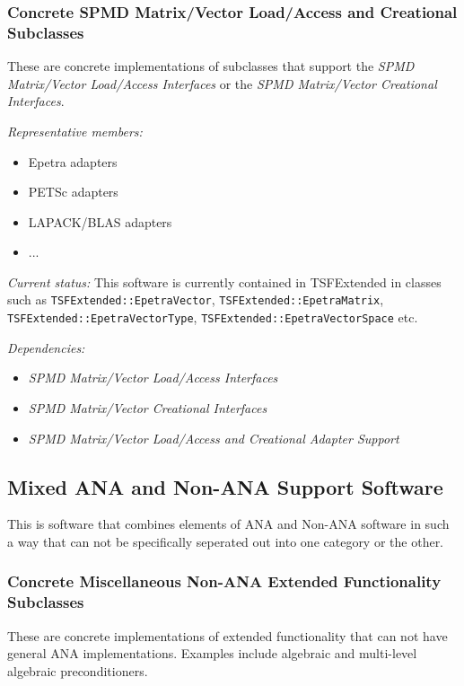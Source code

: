 \documentclass[pdf,ps2pdf,11pt]{SANDreport}
\begin{document}
%
\subsubsection{Concrete SPMD Matrix/Vector Load/Access and Creational Subclasses}
%

These are concrete implementations of subclasses that support the
{}\textit{SPMD Matrix/Vector Load/Access Interfaces} or the {}\textit{SPMD
Matrix/Vector Creational Interfaces}.

{}\textit{Representative members:}
\begin{itemize}
%
{}\item Epetra adapters
%
{}\item PETSc adapters
%
{}\item LAPACK/BLAS adapters
%
{}\item ...
%
\end{itemize}

{}\textit{Current status:} This software is currently contained in TSFExtended
in classes such as {}\texttt{TSFExtended\-::Epetra\-Vector},
{}\texttt{TSFExtended\-::Epetra\-Matrix},
{}\texttt{TSFExtended\-::Epetra\-Vector\-Type},
{}\texttt{TSFExtended\-::Epetra\-Vector\-Space} etc.

{}\textit{Dependencies:}
\begin{itemize}
{}\item{}\textit{SPMD Matrix/Vector Load/Access Interfaces}
{}\item{}\textit{SPMD Matrix/Vector Creational Interfaces}
{}\item{}\textit{SPMD Matrix/Vector Load/Access and Creational Adapter
Support}
\end{itemize}

%
\subsection{Mixed ANA and Non-ANA Support Software}
%

This is software that combines elements of ANA and Non-ANA software in such a
way that can not be specifically seperated out into one category or the other.

%
\subsubsection{Concrete Miscellaneous Non-ANA Extended Functionality Subclasses}
%

These are concrete implementations of extended functionality that can not have
general ANA implementations.  Examples include algebraic and multi-level
algebraic preconditioners.
\end{document}
